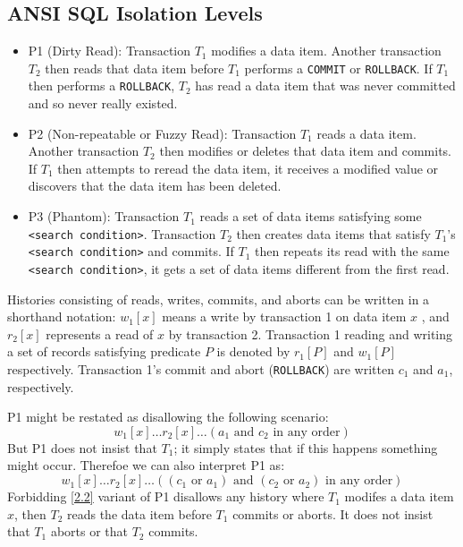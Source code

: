 \documentclass[11pt]{article}
\begin{document}
\subsection{ANSI SQL Isolation Levels}
\label{sec:org8940c45}
\begin{itemize}
\item P1 (Dirty Read): Transaction \(T_1\) modifies a data item. Another transaction \(T_2\) then reads
that data item before \(T_1\) performs a \texttt{COMMIT} or \texttt{ROLLBACK}. If \(T_1\) then performs a \texttt{ROLLBACK},
\(T_2\) has read a data item that was never committed and so never really existed.
\item P2 (Non-repeatable or Fuzzy Read): Transaction \(T_1\) reads a data item. Another transaction
\(T_2\) then modifies or deletes that data item and commits. If \(T_1\) then attempts to reread the
data item, it receives a modified value or discovers that the data item has been deleted.
\item P3 (Phantom): Transaction \(T_1\) reads a set of data items satisfying some \texttt{<search condition>}.
Transaction \(T_2\) then creates data items that satisfy \(T_1\)’s \texttt{<search condition>} and commits.
If \(T_1\) then repeats its read with the same \texttt{<search condition>}, it gets a set of data items
different from the first read.
\end{itemize}

Histories consisting of reads, writes, commits, and aborts can be written in a shorthand notation:
\(w_1[x]\) means a write by transaction 1 on data item \(x\) , and \(r_2[x]\) represents a read of
\(x\) by transaction 2. Transaction 1 reading and writing a set of records satisfying predicate \(P\)
is denoted by \(r_1[P]\) and \(w_1[P]\) respectively. Transaction 1’s commit and abort (\texttt{ROLLBACK}) are
written \(c_1\) and \(a_1\), respectively.

P1 might be restated as disallowing the following scenario:
\begin{equation}
\label{2.1}
w_1[x]\dots r_2[x]\dots(a_1\text{ and }c_2\text{ in any order})
\end{equation}
But P1 does not insist that \(T_1\); it simply states that if this happens something might occur.
Therefoe we can also interpret P1 as:
\begin{equation}
\label{2.2}
w_1[x]\dots r_2[x]\dots((c_1\text{ or }a_1)\text{ and }(c_2\text{ or }a_2)\text{ in any order})
\end{equation}
Forbidding \eqref{2.2} variant of P1 disallows any history where \(T_1\) modifes a data item \(x\), then
\(T_2\) reads the data item before \(T_1\) commits or aborts. It does not insist that \(T_1\) aborts
or that \(T_2\) commits.
\end{document}
